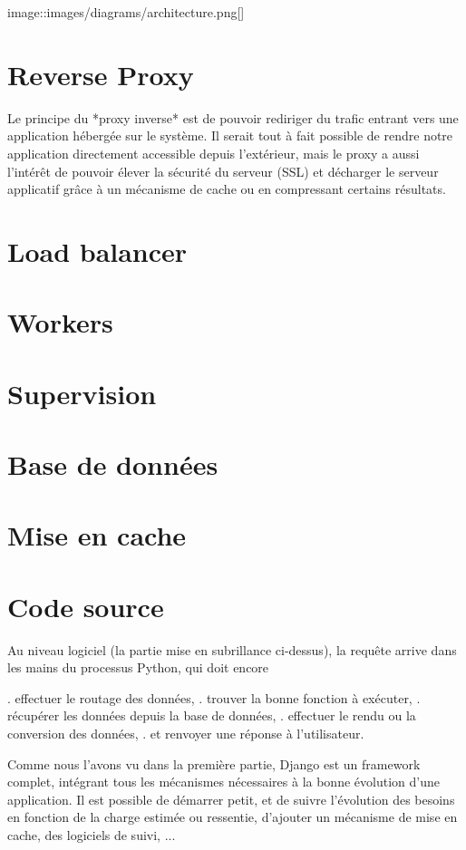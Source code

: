 image::images/diagrams/architecture.png[]

\section{Reverse Proxy}

Le principe du *proxy inverse* est de pouvoir rediriger du trafic entrant vers une application hébergée sur le système. 
Il serait tout à fait possible de rendre notre application directement accessible depuis l'extérieur, mais le proxy a aussi l'intérêt de pouvoir élever la sécurité du serveur (SSL) et décharger le serveur applicatif grâce à un mécanisme de cache ou en compressant certains résultats.

\section{Load balancer}


\section{Workers}


\section{Supervision}


\section{Base de données}


\section{Mise en cache}


\section{Code source}

Au niveau logiciel (la partie mise en subrillance ci-dessus), la requête arrive dans les mains du processus Python, qui doit encore

. effectuer le routage des données,
. trouver la bonne fonction à exécuter,
. récupérer les données depuis la base de données,
. effectuer le rendu ou la conversion des données,
. et renvoyer une réponse à l'utilisateur.

Comme nous l'avons vu dans la première partie, Django est un framework complet, intégrant tous les mécanismes nécessaires à la bonne évolution d'une application.
Il est possible de démarrer petit, et de suivre l'évolution des besoins en fonction de la charge estimée ou ressentie, d'ajouter un mécanisme de mise en cache, des logiciels de suivi, ...

